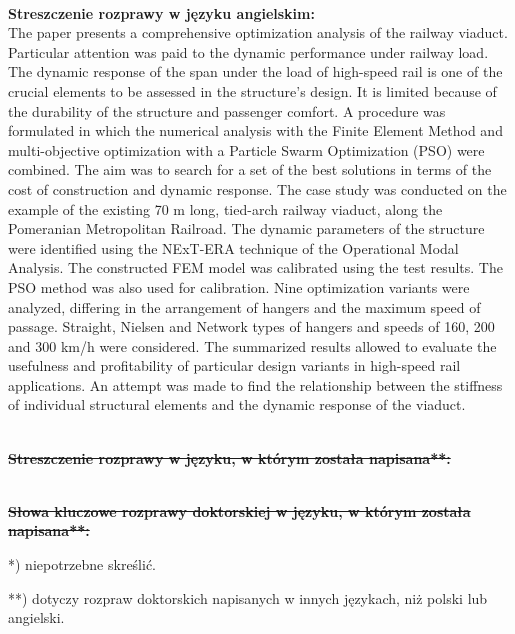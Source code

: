 \begin{myfont}
	\noindent
	\\
	\textbf{Streszczenie rozprawy w języku angielskim:}\\
	The paper presents a comprehensive optimization analysis of the railway viaduct. Particular attention was paid to the dynamic performance under railway load. The dynamic response of the span under the load of high-speed rail is one of the crucial elements to be assessed in the structure's design. It is limited because of the durability of the structure and passenger comfort. A procedure was formulated in which the numerical analysis with the Finite Element Method and multi-objective optimization with a Particle Swarm Optimization (PSO) were combined. The aim was to search for a set of the best solutions in terms of the cost of construction and dynamic response. The case study was conducted on the example of the existing 70 m long, tied-arch railway viaduct, along the Pomeranian Metropolitan Railroad. The dynamic parameters of the structure were identified using the NExT-ERA technique of the Operational Modal Analysis. The constructed FEM model was calibrated using the test results. The PSO method was also used for calibration. Nine optimization variants were analyzed, differing in the arrangement of hangers and the maximum speed of passage. Straight, Nielsen and Network types of hangers and speeds of 160, 200 and 300 km/h were considered. The summarized results allowed to evaluate the usefulness and profitability of particular design variants in high-speed rail applications. An attempt was made to find the relationship between the stiffness of individual structural elements and the dynamic response of the viaduct.
	
	\noindent
	\\
	{\bfseries \sout{Streszczenie rozprawy w języku, w którym została napisana**:}}
	
	\noindent
	\\
	{\bfseries \sout{Słowa kluczowe rozprawy doktorskiej w języku, w którym została napisana**:}}
	\bigskip
	
	*) niepotrzebne skreślić.
	
	**) dotyczy rozpraw doktorskich napisanych w innych językach, niż polski lub angielski.
	\vfill
	\pagebreak[4]
\end{myfont}
